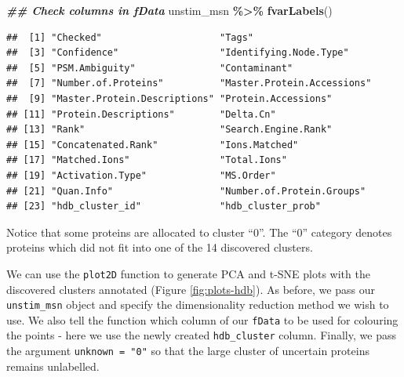 \documentclass[9pt,a4paper,]{extarticle}
\newenvironment{Shaded}{\begin{snugshade}}{\end{snugshade}}
\newcommand{\DocumentationTok}[1]{\textcolor[rgb]{0.56,0.35,0.01}{\textbf{\textit{#1}}}}
\newcommand{\FunctionTok}[1]{\textcolor[rgb]{0.13,0.29,0.53}{\textbf{#1}}}
\newcommand{\NormalTok}[1]{#1}
\newcommand{\SpecialCharTok}[1]{\textcolor[rgb]{0.81,0.36,0.00}{\textbf{#1}}}
\begin{document}
\begin{Shaded}
\begin{Highlighting}[]
\DocumentationTok{\#\# Check columns in fData}
\NormalTok{unstim\_msn }\SpecialCharTok{\%\textgreater{}\%} 
  \FunctionTok{fvarLabels}\NormalTok{()}
\end{Highlighting}
\end{Shaded}

\begin{verbatim}
##  [1] "Checked"                     "Tags"                       
##  [3] "Confidence"                  "Identifying.Node.Type"      
##  [5] "PSM.Ambiguity"               "Contaminant"                
##  [7] "Number.of.Proteins"          "Master.Protein.Accessions"  
##  [9] "Master.Protein.Descriptions" "Protein.Accessions"         
## [11] "Protein.Descriptions"        "Delta.Cn"                   
## [13] "Rank"                        "Search.Engine.Rank"         
## [15] "Concatenated.Rank"           "Ions.Matched"               
## [17] "Matched.Ions"                "Total.Ions"                 
## [19] "Activation.Type"             "MS.Order"                   
## [21] "Quan.Info"                   "Number.of.Protein.Groups"   
## [23] "hdb_cluster_id"              "hdb_cluster_prob"
\end{verbatim}

Notice that some proteins are allocated to cluster ``0''. The ``0'' category
denotes proteins which did not fit into one of the 14 discovered clusters.

We can use the \texttt{plot2D} function to generate PCA and t-SNE plots with the
discovered clusters annotated (Figure \ref{fig:plots-hdb}). As before, we pass our \texttt{unstim\_msn} object and
specify the dimensionality reduction method we wish to use. We also tell the
function which column of our \texttt{fData} to be used for colouring the points - here
we use the newly created \texttt{hdb\_cluster} column. Finally, we pass the argument
\texttt{unknown\ =\ "0"} so that the large cluster of uncertain proteins remains
unlabelled.
\end{document}
